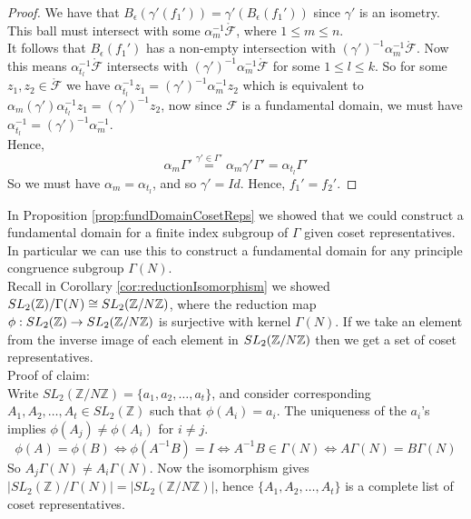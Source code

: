 \begin{proof}
We have that $B_\epsilon(\gamma'(f_1')) = \gamma'(B_\epsilon(f_1'))$ since $\gamma'$ is an isometry. This ball must intersect with some $\alpha_m^{-1}\mathring{\mathcal{F}}$, where $1 \leq m \leq n$.
\\

It follows that $B_\epsilon(f_1')$ has a non-empty intersection with $ (\gamma')^{-1} \alpha_m^{-1}\mathring{\mathcal{F}}$. Now this means $\alpha_{t_l}^{-1}\mathring{\mathcal{F}}$ intersects with $(\gamma')^{-1} \alpha_m^{-1}\mathring{\mathcal{F}}$ for some $1 \leq l \leq k$. So for some $z_1, z_2 \in \mathring{\mathcal{F}}$ we have $\alpha_{t_l}^{-1}z_1 = (\gamma')^{-1} \alpha_m^{-1}z_2$ which is equivalent to $\alpha_m(\gamma')\alpha_{t_l}^{-1}z_1 = (\gamma')^{-1} z_2$, now since $\mathcal{F}$ is a fundamental domain, we must have $\alpha_{t_l}^{-1} = (\gamma')^{-1} \alpha_m^{-1}$.
\\

Hence, 
$$\alpha_m \Gamma' \stackrel{\gamma' \in \Gamma'}{=} \alpha_m \gamma' \Gamma' = \alpha_{t_l}\Gamma'$$
So we must have $\alpha_m = \alpha_{t_l}$, and so $\gamma' = Id$. Hence, $f_1' = f_2'$.

\end{proof}





\begin{remark}
In Proposition \ref{prop:fundDomainCosetReps} we showed that we could construct a fundamental domain for a finite index subgroup of $\Gamma$ given coset representatives. In particular we can use this to construct a fundamental domain for any principle congruence subgroup $\Gamma(N)$.
\\
Recall in Corollary \ref{cor:reductionIsomorphism} we showed $SL_2(\mathbb{Z})/\Gamma(N) \cong SL_2(\mathbb{Z}/N\mathbb{Z})$, where the reduction map $\phi : SL_2(\mathbb{Z}) \rightarrow SL_2(\mathbb{Z}/N\mathbb{Z})$ is surjective with kernel $\Gamma(N)$. If we take an element from the inverse image of each element in $SL_2(\mathbb{Z}/N\mathbb{Z})$ then we get a set of coset representatives. 
\\
Proof of claim:
\\
Write $SL_2(\mathbb{Z}/{N\mathbb{Z}}) = \{a_1,a_2,\dots,a_t\}$, and consider corresponding $A_1,A_2,\dots,A_t \in SL_2(\mathbb{Z})$ such that $\phi(A_i) = a_i$. The uniqueness of the $a_i$'s implies $\phi(A_j) \neq \phi(A_i)$ for $ i \neq j$.
$$\phi(A) = \phi(B)  \iff \phi(A^{-1}B) = I \iff  A^{-1}B \in \Gamma(N)  \iff  A\Gamma(N) = B\Gamma(N)$$
So $A_j\Gamma(N) \neq A_i\Gamma(N)$. Now the isomorphism gives $ \vert SL_2(\mathbb{Z})/\Gamma(N) \vert = \vert  SL_2(\mathbb{Z}/{N\mathbb{Z}})\vert$, hence $\{A_1,A_2,\dots,A_t\}$ is a complete list of coset representatives.
\end{remark}

